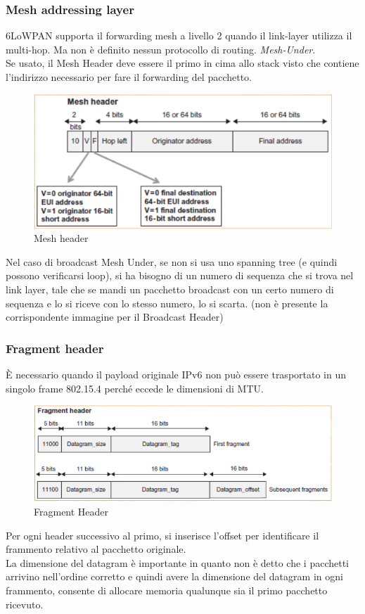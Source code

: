 \documentclass{article}
\begin{document}
\subsubsection{Mesh addressing layer}
6LoWPAN supporta il forwarding mesh a livello 2 quando il link-layer utilizza il multi-hop. Ma non è definito nessun protocollo di routing. \textit{Mesh-Under}.\\
Se usato, il Mesh Header deve essere il primo in cima allo stack visto che contiene l'indirizzo necessario per fare il forwarding del pacchetto.
\begin{figure}[H]
\centering
\includegraphics[scale=0.5]{figures/mesh header.png}
\caption{Mesh header}
\end{figure}
Nel caso di broadcast Mesh Under, se non si usa uno spanning tree (e quindi possono verificarsi loop), si ha bisogno di un numero di sequenza che si trova nel link layer, tale che se mandi un pacchetto broadcast con un certo numero di sequenza e lo si riceve con lo stesso numero, lo si scarta. (non è presente la corrispondente immagine per il Broadcast Header)

\subsubsection{Fragment header}
È necessario quando il payload originale IPv6 non può essere trasportato in un singolo frame 802.15.4 perché eccede le dimensioni di MTU.
\begin{figure}[H]
\centering
\includegraphics[scale=0.5]{figures/6lowpan fragment header.png}
\caption{Fragment Header}
\end{figure}
Per ogni header successivo al primo, si inserisce l'offset per identificare il frammento relativo al pacchetto originale. \\ La dimensione del datagram è importante in quanto non è detto che i pacchetti arrivino nell'ordine corretto e quindi avere la dimensione del datagram in ogni frammento, consente di allocare memoria qualunque sia il primo pacchetto ricevuto.
\end{document}
